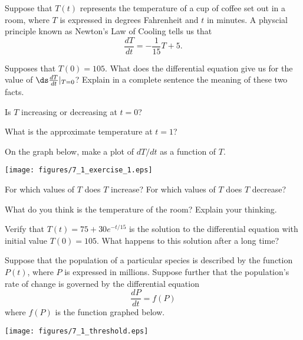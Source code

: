 \begin{exercises} 
  \item Suppose that $T(t)$ represents the temperature of a cup of
    coffee set out in a room, where $T$ is expressed in degrees
    Fahrenheit and $t$ in minutes.  A physcial principle known as    Newton's Law of Cooling tells us that 
    $$
    \frac{dT}{dt}= -\frac1{15}T+5.
    $$

\ba
    \item Supposes that $T(0)=105$.  What does the differential
    equation give us for the value of $\ds \frac{dT}{dt}\vert_{T=0}$?  Explain in a
    complete sentence the meaning of these two facts.

    \item Is $T$ increasing or decreasing at $t=0$?

    \item What is the approximate temperature at $t=1$?

    \item On the graph below, make a plot of $dT/dt$ as a function of $T$.
        \begin{center}
          \texttt{[image: figures/7\_1\_exercise\_1.eps]}
        \end{center}

       \item For which values of $T$ does $T$ increase?  For
        which values of $T$ does $T$ decrease?

        \item What do you think is the temperature of the room?
        Explain your thinking.

        \item Verify that $T(t) = 75 + 30e^{-t/15}$ is the
        solution to the differential equation with initial value $T(0)
        = 105$.  What happens to this solution after a long time?
  \ea
  
  \item Suppose that the population of a particular species is
    described by the function $P(t)$, where $P$ is expressed in
    millions.  Suppose further that the population's rate of change is
    governed by the differential equation 
    $$\frac{dP}{dt} = f(P)
    $$
    where $f(P)$ is the function graphed below.

    \begin{center}
      \texttt{[image: figures/7\_1\_threshold.eps]}
    \end{center}


\end{exercises}
